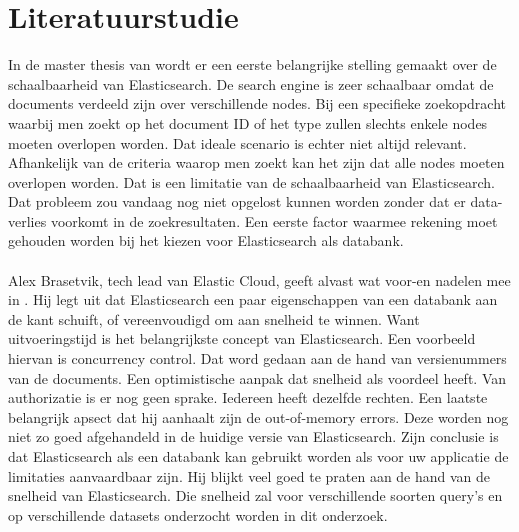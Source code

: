 \documentclass[fleqn,10pt]{voorstel}
\begin{document}
	
	
	\section{Literatuurstudie}
	\label{sec:literatuurstudie}
	
	In de master thesis van \textcite{Berglund2013} wordt er een eerste belangrijke stelling gemaakt over de schaalbaarheid van Elasticsearch. De search engine is zeer schaalbaar omdat de documents verdeeld zijn over verschillende nodes. Bij een specifieke zoekopdracht waarbij men zoekt op het document ID of het type zullen slechts enkele nodes moeten overlopen worden. Dat ideale scenario is echter niet altijd relevant. Afhankelijk van de criteria waarop men zoekt kan het zijn dat alle nodes moeten overlopen worden. Dat is een limitatie van de schaalbaarheid van Elasticsearch. Dat probleem zou vandaag nog niet opgelost kunnen worden zonder dat er data-verlies voorkomt in de zoekresultaten. Een eerste factor waarmee rekening moet gehouden worden bij het kiezen voor Elasticsearch als databank.
	\\
	\\
	Alex Brasetvik, tech lead van Elastic Cloud, geeft alvast wat voor-en nadelen mee in \textcite{Brasetvik2013}. Hij legt uit dat Elasticsearch een paar eigenschappen van een databank aan de kant schuift, of vereenvoudigd om aan snelheid te winnen. Want uitvoeringstijd is het belangrijkste concept van Elasticsearch. Een voorbeeld hiervan is concurrency control. Dat word gedaan aan de hand van versienummers van de documents. Een optimistische aanpak dat snelheid als voordeel heeft. Van authorizatie is er nog geen sprake. Iedereen heeft dezelfde rechten. Een laatste belangrijk apsect dat hij aanhaalt zijn de out-of-memory errors. Deze worden nog niet zo goed afgehandeld in de huidige versie van Elasticsearch.
	Zijn conclusie is dat Elasticsearch als een databank kan gebruikt worden als voor uw applicatie de limitaties aanvaardbaar zijn. Hij blijkt veel goed te praten aan de hand van de snelheid van Elasticsearch. Die snelheid zal voor verschillende soorten query’s en op verschillende datasets onderzocht worden in dit onderzoek.
	
	
	
\end{document}
